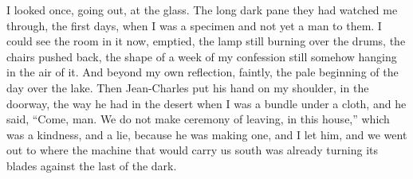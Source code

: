 I looked once, going out, at the glass. The long dark pane they had watched me through, the first days, when I was a specimen and not yet a man to them. I could see the room in it now, emptied, the lamp still burning over the drums, the chairs pushed back, the shape of a week of my confession still somehow hanging in the air of it. And beyond my own reflection, faintly, the pale beginning of the day over the lake. Then Jean-Charles put his hand on my shoulder, in the doorway, the way he had in the desert when I was a bundle under a cloth, and he said, ``Come, man. We do not make ceremony of leaving, in this house,'' which was a kindness, and a lie, because he was making one, and I let him, and we went out to where the machine that would carry us south was already turning its blades against the last of the dark.\par

